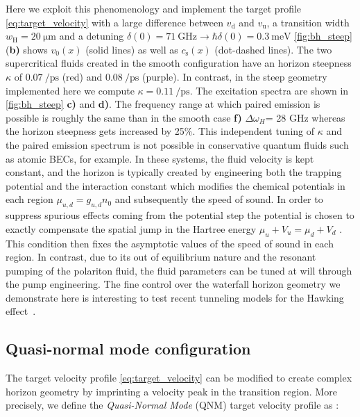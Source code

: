 Here we exploit this phenomenology and implement the target profile \autoref{eq:target_velocity} with a large difference between $v_\mathrm{d}$ and $v_\mathrm{u}$, a transition width $w_\mathrm{H}=\SI{20}{\micro\meter}$ and a detuning $\delta(0)=\SI{71}{\giga\hertz} \rightarrow\hbar\delta(0)=\SI{0.3}{\milli \electronvolt}$
\autoref{fig:bh_steep} (\textbf{b)} shows $v_0(x)$ (solid lines) as well as $c_\mathrm{s}(x)$ (dot-dashed lines). The two supercritical fluids created in the smooth configuration 
have an horizon steepness $\kappa$ of $\SI{0.07}{\per \pico \second}$ (red) and $\SI{0.08}{\per \pico \second}$ (purple). In contrast, in the steep geometry implemented here we compute $\kappa = \SI{0.11}{\per \pico \second}$. The excitation spectra are shown in \autoref{fig:bh_steep} \textbf{c)} and \textbf{d)}.
The frequency range at which paired emission is possible is roughly the same than in the smooth case \textbf{f)} $\Delta \omega_H$= 28 GHz whereas the horizon steepness 
gets increased by 25\%. This independent tuning of $\kappa$ and the paired emission spectrum is not possible in conservative quantum fluids such as atomic BECs, for example. In these systems, the fluid velocity is kept constant, and the horizon is typically created by engineering 
both the trapping potential and the interaction constant which modifies the chemical potentials in each region $\mu _{u,d}=g_{u,d}n_0$ and subsequently the speed of sound. In order to suppress spurious effects coming from the potential step 
the potential is chosen to exactly compensate the spatial jump in the Hartree energy $\mu_u+ V_u=\mu_d+V_d$ \cite{Recati_acousticHR_2009}. This condition then fixes the asymptotic values of the speed of sound in each region.
In contrast, due to its out of equilibrium nature and the resonant pumping of the polariton fluid, the fluid parameters can be tuned at will through the pump engineering.
The fine control over the waterfall horizon geometry we demonstrate here is interesting to test recent tunneling models for the Hawking effect~\cite{delporro2024tunneling}.




\subsection{Quasi-normal mode configuration}

The target velocity profile \autoref{eq:target_velocity} can be modified to create complex horizon geometry by imprinting 
a velocity peak in the transition region. More precisely, we define the \textit{Quasi-Normal Mode} (QNM) target velocity profile as :

